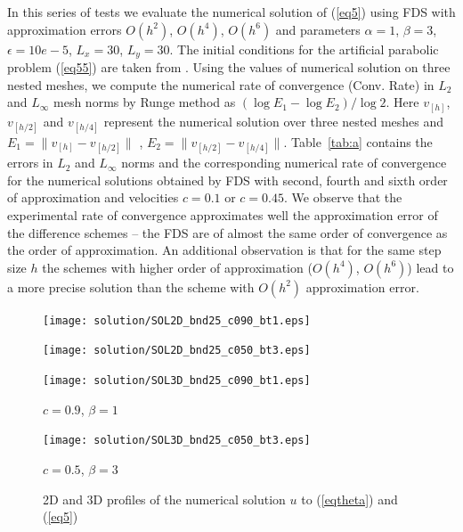 \documentclass[leqno,11pt]{book}
\newcommand{\rf}[1]{(\ref{#1})}
\begin{document}


 In this series of tests we evaluate the numerical solution of \rf{eq5} using FDS with approximation errors $O(h^2)$, $O(h^4)$, $O(h^6)$ and parameters  
 $\alpha = 1$,   $\beta=3$,  $\epsilon = 10e-5$, 
$L_{x }= 30$, $L_{y} = 30$.
The initial conditions for the artificial parabolic problem \rf{eq55} are taken from  \cite{Ch2011}. 
Using the values of numerical solution on three nested meshes, we compute the numerical rate of convergence (Conv. Rate) in $L_2$ and $L_{\infty}$ mesh norms
by Runge method as $(\log E_1 -\log E_2)/\log 2$.  Here  $v_{[h]}$, $v_{ {[h/2]}  }$ and  $v_{ {[h/4]}  }$ represent the numerical solution over three nested meshes and $E_1=\|v_{[h]}-v_{[h/2]}\|$ , $E_2=\|v_{[h/2]}-v_{[h/4]}\|$.  
Table~\ref{tab:a} contains the errors in $L_2$ and $L_{\infty}$ norms and the corresponding numerical rate of convergence for the numerical solutions obtained by FDS with second, fourth and sixth order of approximation and   velocities  $c=0.1$  or $c=0.45$.
We observe that the experimental rate of convergence approximates well the approximation error of the difference schemes -- the FDS are of  almost the same order of convergence as the order of approximation. An additional observation  is that  for  the same step size $h$ the schemes with higher order of approximation ($O(h^4)$, $O(h^6)$) lead to a more precise solution than the scheme with $O(h^2)$ approximation error. 

\begin{figure}[ht]
	\begin{minipage}[b]{0.5\linewidth}
		\raggedleft
		\texttt{[image: solution/SOL2D\_bnd25\_c090\_bt1.eps]}
	\end{minipage}
	\begin{minipage}[b]{0.5\linewidth}
		\raggedright
		\texttt{[image: solution/SOL2D\_bnd25\_c050\_bt3.eps]}
	\end{minipage}
	\begin{minipage}[b]{0.45\linewidth}
		 \raggedleft
		\texttt{[image: solution/SOL3D\_bnd25\_c090\_bt1.eps]}
		\centerline{$c = 0.9$, $\beta = 1$}
	\end{minipage}
	\begin{minipage}[b]{0.5\linewidth}
		 \raggedright
		\texttt{[image: solution/SOL3D\_bnd25\_c050\_bt3.eps]}
		\centerline{$c = 0.5$, $\beta = 3$}
	\end{minipage}
	\caption{2D and 3D profiles of the numerical solution $u$ to \rf{eqtheta} and \rf{eq5}}
	\label{fig:solutions}
\end{figure}
\end{document}
